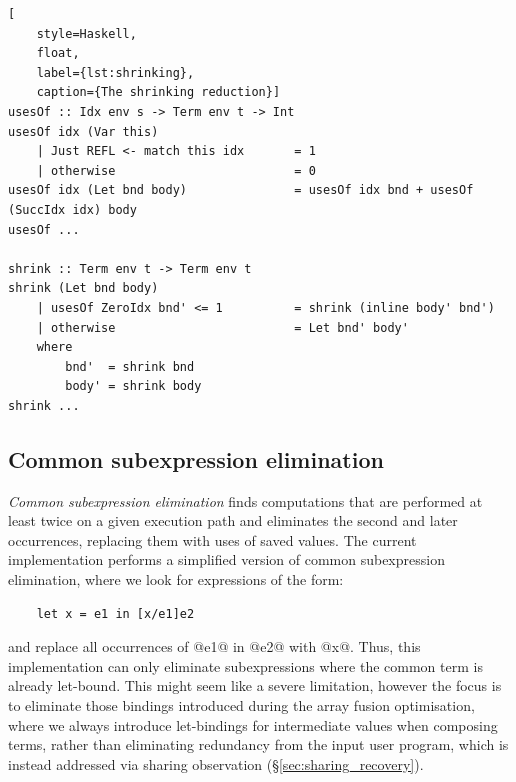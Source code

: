 
\begin{lstlisting}[
    style=Haskell,
    float,
    label={lst:shrinking},
    caption={The shrinking reduction}]
usesOf :: Idx env s -> Term env t -> Int
usesOf idx (Var this)
    | Just REFL <- match this idx       = 1
    | otherwise                         = 0
usesOf idx (Let bnd body)               = usesOf idx bnd + usesOf (SuccIdx idx) body
usesOf ...

shrink :: Term env t -> Term env t
shrink (Let bnd body)
    | usesOf ZeroIdx bnd' <= 1          = shrink (inline body' bnd')
    | otherwise                         = Let bnd' body'
    where
        bnd'  = shrink bnd
        body' = shrink body
shrink ...
\end{lstlisting}


\subsection{Common subexpression elimination}
\label{sec:cse}

\emph{Common subexpression elimination} finds computations that are performed at
least twice on a given execution path and eliminates the second and later
occurrences, replacing them with uses of saved values. The current
implementation performs a simplified version of common subexpression
elimination, where we look for expressions of the form:
%
\begin{lstlisting}[style=Haskell,numbers=none]
%\bf$\langle$ common subexpression elimination $\rangle$%
    let x = e1 in [x/e1]e2
\end{lstlisting}
%
and replace all occurrences of @e1@ in @e2@ with @x@. Thus, this implementation
can only eliminate subexpressions where the common term is already let-bound.
This might seem like a severe limitation, however the focus is to eliminate
those bindings introduced during the array fusion optimisation, where we always
introduce let-bindings for intermediate values when composing terms, rather than
eliminating redundancy from the input user program, which is instead addressed
via sharing observation (\S\ref{sec:sharing_recovery}).

